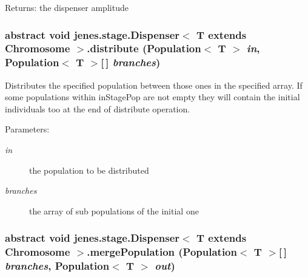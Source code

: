 \begin{Desc}
\item[Returns:]the dispenser amplitude \end{Desc}
\hypertarget{classjenes_1_1stage_1_1_dispenser_3_01_t_01extends_01_chromosome_01_4_e9eb1e3be8a72e70e2bc75c53f31265b}{
\subsubsection[distribute]{\setlength{\rightskip}{0pt plus 5cm}abstract void jenes.stage.Dispenser$<$ T extends Chromosome $>$.distribute (Population$<$ T $>$ {\em in}, \/  Population$<$ T $>$\mbox{[}$\,$\mbox{]} {\em branches})}}
\label{classjenes_1_1stage_1_1_dispenser_3_01_t_01extends_01_chromosome_01_4_e9eb1e3be8a72e70e2bc75c53f31265b}


Distributes the specified population between those ones in the specified array. If some populations within inStagePop are not empty they will contain the initial individuals too at the end of distribute operation. 

\begin{Desc}
\item[Parameters:]
\begin{description}
\item[{\em in}]the population to be distributed \item[{\em branches}]the array of sub populations of the initial one \end{description}
\end{Desc}
\hypertarget{classjenes_1_1stage_1_1_dispenser_3_01_t_01extends_01_chromosome_01_4_e35fcd8e2c1ecf6c9069107122b8a894}{
\subsubsection[mergePopulation]{\setlength{\rightskip}{0pt plus 5cm}abstract void jenes.stage.Dispenser$<$ T extends Chromosome $>$.mergePopulation (Population$<$ T $>$\mbox{[}$\,$\mbox{]} {\em branches}, \/  Population$<$ T $>$ {\em out})}}
\label{classjenes_1_1stage_1_1_dispenser_3_01_t_01extends_01_chromosome_01_4_e35fcd8e2c1ecf6c9069107122b8a894}


